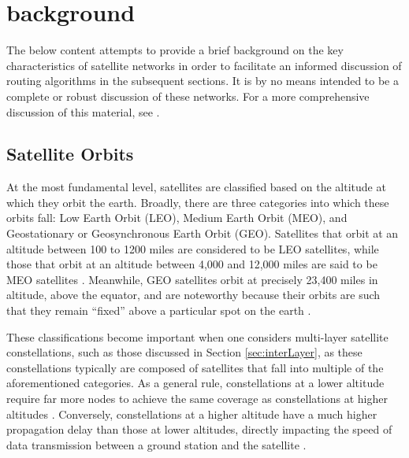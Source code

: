 
\section{background}\label{sec:background}
The below content attempts to provide a brief background on the key characteristics of satellite networks in order to facilitate an informed discussion of routing algorithms in the subsequent sections. It is by no means intended to be a complete or robust discussion of these networks. For a more comprehensive discussion of this material, see \cite{elbert_introduction_2008}.

\subsection{Satellite Orbits}\label{subsec:satelliteOrbits}
At the most fundamental level, satellites are classified based on the altitude at which they orbit the earth. Broadly, there are three categories into which these orbits fall: Low Earth Orbit (LEO), Medium Earth Orbit (MEO), and Geostationary or Geosynchronous Earth Orbit (GEO)\cite{stone_introduction_2004}. Satellites that orbit at an altitude between 100 to 1200 miles are considered to be LEO satellites, while those that orbit at an altitude between 4,000 and 12,000 miles are said to be MEO satellites \cite{stone_introduction_2004}. Meanwhile, GEO satellites orbit at precisely 23,400 miles in altitude, above the equator, and are noteworthy because their orbits are such that they remain ``fixed'' above a particular spot on the earth \cite{stone_introduction_2004}. 

These classifications become important when one considers multi-layer satellite constellations, such as those discussed in Section \ref{sec:interLayer}, as these constellations typically are composed of satellites that fall into multiple of the aforementioned categories. As a general rule, constellations at a lower altitude require far more nodes to achieve the same coverage as constellations at higher altitudes \cite{elbert_introduction_2008}. Conversely, constellations at a higher altitude have a much higher propagation delay than those at lower altitudes, directly impacting the speed of data transmission between a ground station and the satellite \cite{elbert_introduction_2008}.

